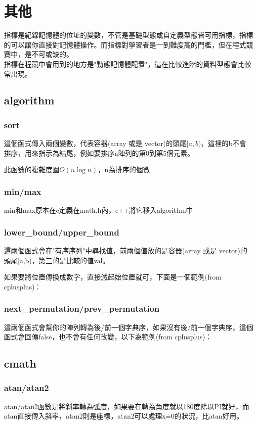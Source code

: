 \section{其他}

指標是紀錄記憶體的位址的變數，不管是基礎型態或自定義型態皆可用指標，指標的可以讓你直接對記憶體操作。而指標對學習者是一到難度高的門檻，但在程式競賽中，是不可或缺的。\\ 指標在程競中會用到的地方是"動態記憶體配置"，這在比較進階的資料型態會比較常出現。


\subsection{algorithm}
\subsubsection{sort}
這個函式傳入兩個變數，代表容器(array 或是 vector)的頭尾$[a,b)$，這裡的b不會排序，用來指示為結尾，例如要排序a陣列的第0到第5個元素。

此函數的複雜度圍$O(n\log n)$，n為排序的個數
\subsubsection{min/max}
min和max原本在c定義在math.h內，c++將它移入algorithm中

\subsubsection{lower\_bound/upper\_bound}
這兩個函式會在"有序序列"中尋找值，前兩個值放的是容器(array 或是 vector)的頭尾[a,b)，第三的是比較的值val。

如果要將位置傳換成數字，直接減起始位置就可，下面是一個範例(from cplusplus)：

\subsubsection{next\_permutation/prev\_permutation}
這兩個函式會幫你的陣列轉為後/前一個字典序，如果沒有後/前一個字典序，這個函式會回傳false，也不會有任何改變，以下為範例(from cplusplus)：

\subsection{cmath}
\subsubsection{atan/atan2} 
atan/atan2函數是將斜率轉為弧度，如果要在轉為角度就以180度除以PI就好，而atan直接傳入斜率，atan2則是座標，atan2可以處理x=0的狀況，比atan好用。

